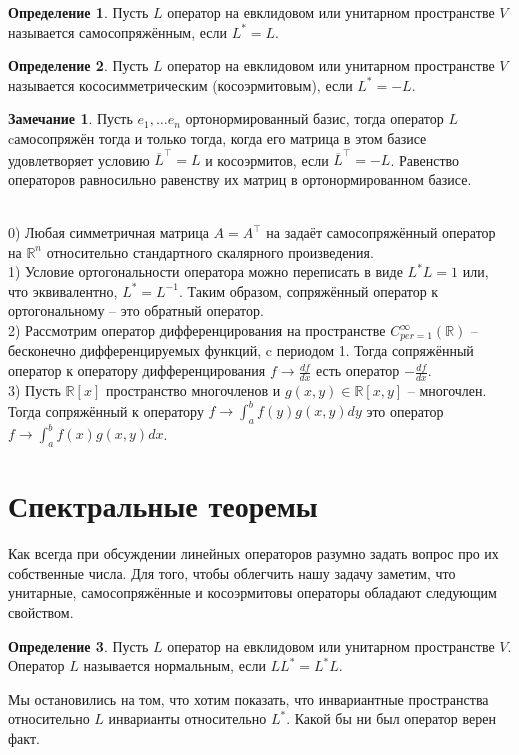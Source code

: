 \documentclass[10pt,a4paper,oneside]{book}
\theoremstyle{definition}
\newtheorem*{rem}{Замечание}
\newtheorem*{defn}{Определение}
\newcommand{\mb}[1]{\mathbb{#1}}
\newcommand{\ovl}{\overline}
\def\exm{\noindent {\bf Примеры:}}
\def\dfn{\begin{defn}}
\def\edfn{\end{defn}}
\def\rm{\begin{rem}}
\def\erm{\end{rem}}
\begin{document}
\dfn Пусть $L$ оператор на евклидовом или унитарном пространстве $V$ называется самосопряжённым, если $L^*=L$.
\edfn

\dfn Пусть $L$ оператор на евклидовом или унитарном пространстве $V$ называется кососимметрическим (косоэрмитовым), если $L^*=-L$.
\edfn

\rm Пусть $e_1,\dots e_n$ ортонормированный базис, тогда оператор $L$ cамосопряжён тогда и только тогда, когда его матрица в этом базисе удовлетворяет условию $\ovl{L}^{\top}=L$ и косоэрмитов, если $\ovl{L}^{\top}=-L$.
\proof Равенство операторов равносильно равенству их матриц в ортонормированном базисе.
\endproof
\erm



\exm\\
0) Любая симметричная матрица $A=A^{\top}$ на  задаёт самосопряжённый оператор на $\mb R^n$ относительно стандартного скалярного произведения.\\
1) Условие ортогональности оператора можно переписать в виде $L^*L=1$ или, что эквивалентно, $L^*=L^{-1}$. Таким образом, сопряжённый оператор к ортогональному -- это обратный оператор.\\
2) Рассмотрим оператор дифференцирования на пространстве $C^{\infty}_{per=1}(\mb R)$ -- бесконечно дифференцируемых функций, c периодом 1. Тогда сопряжённый оператор к оператору дифференцирования  $f \to \frac{df}{dx}$ есть оператор $-\frac{df}{dx}$.\\
3) Пусть $\mb R[x]$ пространство многочленов и $g(x,y) \in \mb R[x,y]$ -- многочлен. Тогда сопряжённый к оператору $f \to \int_{a}^b f(y)g(x,y)dy$ это оператор $f\to\int_{a}^b f(x)g(x,y)dx$.





\section{Спектральные теоремы}

Как всегда при обсуждении линейных операторов разумно задать вопрос про их собственные числа. Для того, чтобы облегчить нашу задачу заметим, что унитарные, самосопряжённые и косоэрмитовы операторы обладают следующим свойством.

\dfn Пусть $L$ оператор на евклидовом или унитарном пространстве $V$. Оператор $L$ называется нормальным, если $LL^*=L^*L$.
\edfn



Мы остановились на том, что хотим показать, что инвариантные пространства относительно $L$ инварианты относительно $L^*$. Какой бы ни был оператор верен факт.
\end{document}
